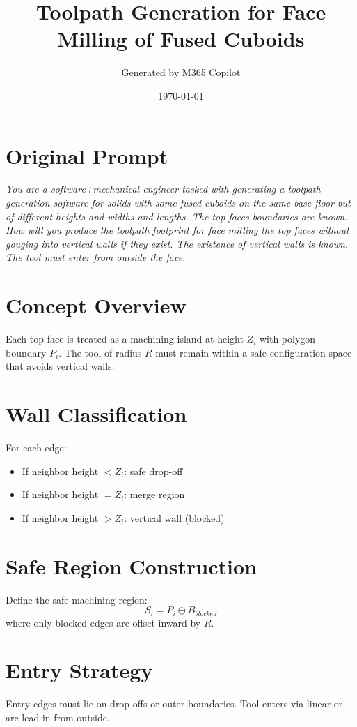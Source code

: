 \documentclass{article}
\title{Toolpath Generation for Face Milling of Fused Cuboids}
\author{Generated by M365 Copilot}
\date{\today}
\begin{document}
\maketitle

\section*{Original Prompt}
\textit{You are a software+mechanical engineer tasked with generating a toolpath generation software for solids with some fused cuboids on the same base floor but of different heights and widths and lengths. The top faces boundaries are known. How will you produce the toolpath footprint for face milling the top faces without gouging into vertical walls if they exist. The existence of vertical walls is known. The tool must enter from outside the face.}

\section*{Concept Overview}
Each top face is treated as a machining island at height $Z_i$ with polygon boundary $P_i$. The tool of radius $R$ must remain within a safe configuration space that avoids vertical walls.

\section*{Wall Classification}
For each edge:
\begin{itemize}
    \item If neighbor height $< Z_i$: safe drop-off
    \item If neighbor height $= Z_i$: merge region
    \item If neighbor height $> Z_i$: vertical wall (blocked)
\end{itemize}

\section*{Safe Region Construction}
Define the safe machining region:
\[
S_i = P_i \ominus B_{blocked}
\]
where only blocked edges are offset inward by $R$.

\section*{Entry Strategy}
Entry edges must lie on drop-offs or outer boundaries. Tool enters via linear or arc lead-in from outside.
\end{document}
